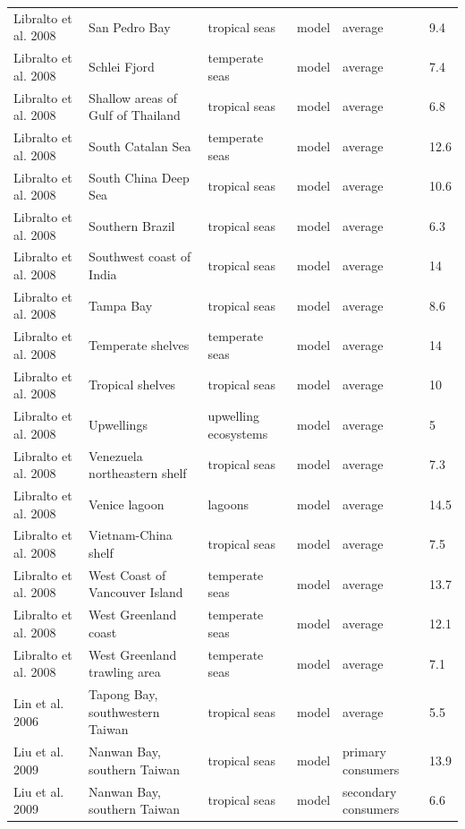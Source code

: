 \documentclass[oneside,12pt,final]{sty/ucthesis-CA2012}
\begin{document}
\begin{mainmatter}
\begin{longtable} {p{4cm}p{3cm}p{2cm}lp{2cm}p{2cm}}
    Libralto et al. 2008  & San Pedro Bay & tropical seas & model & average & 9.4 \\
    Libralto et al. 2008   & Schlei Fjord & temperate seas & model & average & 7.4 \\
    Libralto et al. 2008   & Shallow areas of Gulf of Thailand & tropical seas & model & average & 6.8 \\
    Libralto et al. 2008   & South Catalan Sea & temperate seas & model & average & 12.6 \\
    Libralto et al. 2008   & South China Deep Sea & tropical seas & model & average & 10.6 \\
    Libralto et al. 2008   & Southern Brazil & tropical seas & model & average & 6.3 \\
    Libralto et al. 2008   & Southwest coast of India & tropical seas & model & average & 14 \\
    Libralto et al. 2008  & Tampa Bay & tropical seas & model & average & 8.6 \\
    Libralto et al. 2008  & Temperate shelves & temperate seas & model & average & 14 \\
    Libralto et al. 2008   & Tropical shelves & tropical seas & model & average & 10 \\
    Libralto et al. 2008   & Upwellings & upwelling ecosystems & model & average & 5 \\
    Libralto et al. 2008   & Venezuela northeastern shelf & tropical seas & model & average & 7.3 \\
    Libralto et al. 2008   & Venice lagoon & lagoons & model & average & 14.5 \\
    Libralto et al. 2008   & Vietnam-China shelf & tropical seas & model & average & 7.5 \\
    Libralto et al. 2008   & West Coast of Vancouver Island & temperate seas & model & average & 13.7 \\
    Libralto et al. 2008   & West Greenland  coast & temperate seas & model & average & 12.1 \\
    Libralto et al. 2008   & West Greenland trawling area & temperate seas & model & average & 7.1 \\
    Lin et al. 2006  &  Tapong Bay, southwestern Taiwan & tropical seas & model & average & 5.5 \\
    Liu et al. 2009  &  Nanwan Bay, southern Taiwan & tropical seas & model & primary consumers & 13.9 \\
    Liu et al. 2009  &  Nanwan Bay, southern Taiwan & tropical seas & model & secondary consumers & 6.6 \\

\end{longtable}
\end{mainmatter}
\end{document}
